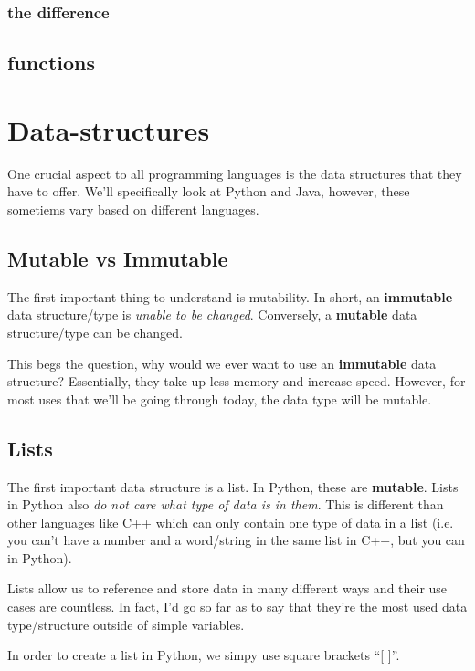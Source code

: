 \documentclass[12pt,a4paper]{book}
\begin{document}
				\subsection{the difference}
					\vspace{10cm}


		\section{functions}
		
	\chapter{Data-structures}  \label{chap:datastructures}
		One crucial aspect to all programming languages is the data structures that they have to offer. We'll specifically look at Python and Java, however, these sometiems vary based on different  languages.
		\section{Mutable vs Immutable}
			The first important thing to understand is mutability. In short, an \textbf{immutable} data structure/type is \textit{unable to be changed}. Conversely, a \textbf{mutable} data structure/type can be changed.
			
			This begs the question, why would we ever want to use an \textbf{immutable} data structure? Essentially, they take up less memory and increase speed. However, for most uses that we'll be going through today, the data type will be mutable.
		\section{Lists}
			The first important data structure is a list. In Python, these are \textbf{mutable}. Lists in Python also \textit{do not care what type of data is in them}. This is different than other languages like C++ which can only contain one type of data in a list (i.e. you can't have a number and a word/string in the same list in C++, but you can in Python).
			
			Lists allow us to reference and store data in many different ways and their use cases are countless. In fact, I'd go so far as to say that they're the most used data type/structure outside of simple variables.
			
			In order to create a list in Python, we simpy use square brackets ``[ ]''.
  			 
\end{document}
